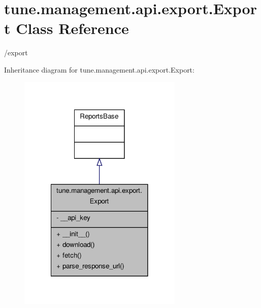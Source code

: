 \hypertarget{classtune_1_1management_1_1api_1_1export_1_1Export}{\section{tune.\-management.\-api.\-export.\-Export Class Reference}
\label{classtune_1_1management_1_1api_1_1export_1_1Export}
}


/export  




Inheritance diagram for tune.\-management.\-api.\-export.\-Export\-:
\nopagebreak
\begin{figure}[H]
\begin{center}
\leavevmode
\includegraphics[width=222pt]{classtune_1_1management_1_1api_1_1export_1_1Export__inherit__graph}
\end{center}
\end{figure}


